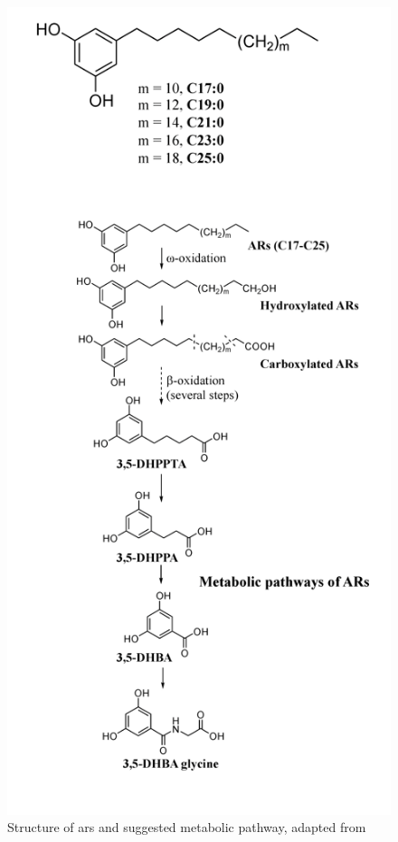 
\begin{figure}[h!]
	\centering
	\includegraphics[width=0.5\linewidth]{picture/ars_sang_pathway}
	\caption{Structure of \acrshort{ars} and suggested metabolic pathway, adapted from \cite{ISI:000447355100002}}
	\label{fig:structure_ars}
\end{figure}

